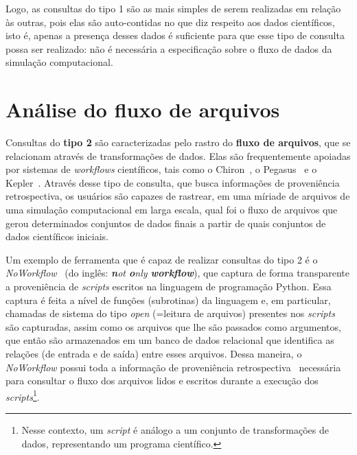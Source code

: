 
Logo, as consultas do tipo 1 são as mais simples de serem realizadas em relação às outras, pois elas são auto-contidas no que diz respeito aos dados científicos, isto é, apenas a presença desses dados é suficiente para que esse tipo de consulta possa ser realizado: não é necessária a especificação sobre o fluxo de dados da simulação computacional.

\section{Análise do fluxo de arquivos}%
\label{sec:rastreio-de-fluxos-de-arquivos}

Consultas do \textbf{tipo 2} são caracterizadas pelo rastro do \textbf{fluxo de arquivos}, que se relacionam através de transformações de dados. Elas são frequentemente apoiadas por sistemas de \textit{workflows} científicos, tais como o Chiron~\cite{ogasawara2011algebraic}, o Pegasus~\cite{deelman2005pegasus} e o Kepler~\cite{ludascher2006scientific}. Através desse tipo de consulta, que busca informações de proveniência retrospectiva, os usuários são capazes de rastrear, em uma míriade de arquivos de uma simulação computacional em larga escala, qual foi o fluxo de arquivos que gerou determinados conjuntos de dados finais a partir de quais conjuntos de dados científicos iniciais.

Um exemplo de ferramenta que é capaz de realizar consultas do tipo 2 é o \textit{NoWorkflow}~\cite{murta2014noworkflow} (do inglês: \textit{\textbf{n}ot \textbf{o}nly \textbf{workflow}}), que captura de forma transparente a proveniência de \textit{scripts} escritos na linguagem de programação Python. Essa captura é feita a nível de funções (subrotinas) da linguagem e, em particular, chamadas de sistema do tipo \emph{open} (=leitura de arquivos) presentes nos \textit{scripts} são capturadas, assim como os arquivos que lhe são passados como argumentos, que então são armazenados em um banco de dados relacional que identifica as relações (de entrada e de saída) entre esses arquivos. Dessa maneira, o \textit{NoWorkflow} possui toda a informação de proveniência retrospectiva~\cite{Pimentel2016} necessária para consultar o fluxo dos arquivos lidos e escritos durante a execução dos \textit{scripts}\footnote{Nesse contexto, um \textit{script} é análogo a um conjunto de transformações de dados, representando um programa científico.}.

